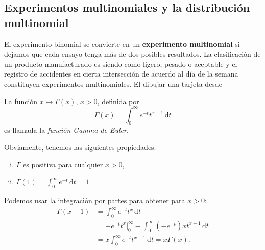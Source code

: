 \subsection*{Experimentos multinomiales y la distribución multinomial}

El experimento binomial se convierte en un \textbf{experimento multinomial} si dejamos que cada ensayo tenga más de dos posibles resultados. La clasificación de un producto manufacturado es siendo como ligero, pesado o aceptable y el registro de accidentes en cierta intersección de acuerdo al día de la semana constituyen experimentos multinomiales. El dibujar una tarjeta desde

\begin{definition}
La función $x\mapsto \Gamma(x)$, $x>0$, definida por
\begin{equation}
\Gamma(x)=\int_{0}^{\infty}e^{-t}t^{x-1}\,\mathrm{d}t
\end{equation}
es llamada la \emph{función Gamma de Euler}.
\end{definition}
Obviamente, tenemos las siguientes propiedades:
\begin{enumerate}[(i)]
	\item $\Gamma$ es positiva para cualquier $x>0$,
	\item $\Gamma(1)=\int_0^\infty e^{-t}\,\mathrm{d}t=1$.
\end{enumerate}
Podemos usar la integración por partes para obtener para $x>0$:
\begin{align*}
\Gamma(x+1) &= \int_{0}^{\infty}e^{-t}t^{x}\,\mathrm{d}t\\
						&=-e^{-t}t^{x}\Big|_0^\infty - \int_{0}^{\infty}\left(-e^{-t}\right)xt^{x-1}\,\mathrm{d}t\\
						&=x\int_{0}^{\infty}e^{-t}t^{x-1}\,\mathrm{d}t=x\Gamma(x).
\end{align*}